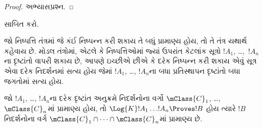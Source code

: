 \begin{proof}
  અભ્યાસપ્રશ્ન.
\end{proof}

\begin{prob}
   સાબિત કરો.
\end{prob}
\endgroup

\begingroup
\makeatletter{}\makeatother


\label{guunit:OLP-0436}


જો નિષ્પત્તિ તંત્રમાં જે કંઈ નિષ્પન્ન કરી શકાય તે બધું
પ્રામાણ્ય હોય, તો તે તંત્ર યથાર્થ કહેવાય છે. મોડલ તંત્રોમાં, એટલે કે
નિષ્પત્તિઓમાં જ્યાં  ઉપરાંત કેટલાંક સૂત્રો $!A_1$,
\dots,~$!A_n$ના દૃષ્ટાંતો વાપરી શકાય છે, આપણે ઇચ્છીએ છીએ કે દરેક
નિષ્પન્ન કરી શકાય એવું સૂત્ર એવા દરેક નિદર્શનમાં સત્ય હોય જેમાં $!A_1$,
\dots, $!A_n$ના બધા પ્રતિસ્થાપન દૃષ્ટાંતો બધા જગતોમાં સત્ય હોય.

\begin{thm}[યથાર્થતાનું પ્રમેય]
  જો $!A_1$, \dots, $!A_n$ના દરેક દૃષ્ટાંત અનુક્રમે નિદર્શનોના
  વર્ગો $\mClass{C}_1$, \dots, $\mClass{C}_n$માં પ્રામાણ્ય હોય,
  તો $\Log{K}!A_1\dots !A_n
  \Proves !B$ હોય ત્યારે $!B$ નિદર્શનોના વર્ગ
  $\mClass{C}_1 \cap \dots \cap \mClass{C}_n$માં પ્રામાણ્ય છે.
\end{thm}

